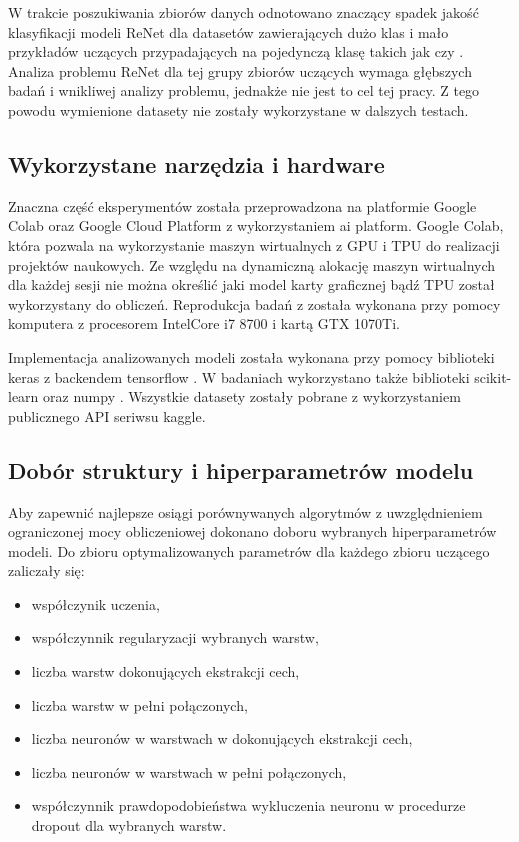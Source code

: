 \documentclass[oneside, mag]{mgr}
\begin{document}
W trakcie poszukiwania zbiorów danych odnotowano znaczący spadek jakość klasyfikacji modeli ReNet dla datasetów zawierających dużo klas i mało przykładów uczących przypadających na pojedynczą klasę takich jak \cite{fruits-dataset} czy \cite{face-dataset}. Analiza problemu ReNet dla tej grupy zbiorów uczących wymaga głębszych badań i wnikliwej analizy problemu, jednakże nie jest to cel tej pracy. Z tego powodu wymienione datasety nie zostały wykorzystane w dalszych testach. 

\subsection{Wykorzystane narzędzia i hardware}

Znaczna część eksperymentów została przeprowadzona na platformie Google Colab oraz Google Cloud Platform z wykorzystaniem ai platform. Google Colab, która pozwala na wykorzystanie maszyn wirtualnych z GPU i TPU do realizacji projektów naukowych. Ze względu na dynamiczną alokację maszyn wirtualnych dla każdej sesji nie można określić jaki model karty graficznej bądź TPU został wykorzystany do obliczeń. Reprodukcja badań z \cite{DBLP:journals/corr/VisinKCMCB15} została wykonana przy pomocy komputera z procesorem IntelCore i7 8700 i kartą GTX 1070Ti.

Implementacja analizowanych modeli została wykonana przy pomocy biblioteki keras \cite{keras} z backendem tensorflow \cite{tensorflow}. W badaniach wykorzystano także biblioteki scikit-learn \cite{scikit-learn} oraz numpy \cite{numpy}. Wszystkie datasety zostały pobrane z wykorzystaniem publicznego API seriwsu kaggle.

\subsection{Dobór struktury i hiperparametrów modelu}

Aby zapewnić najlepsze osiągi porównywanych algorytmów z uwzględnieniem ograniczonej mocy obliczeniowej dokonano doboru wybranych hiperparametrów modeli. Do zbioru optymalizowanych parametrów dla każdego zbioru uczącego zaliczały się:

\begin{itemize}
\item współczynik uczenia,
\item współczynnik regularyzacji wybranych warstw,
\item liczba warstw dokonujących ekstrakcji cech,
\item liczba warstw w pełni połączonych,
\item liczba neuronów w warstwach w dokonujących ekstrakcji cech,
\item liczba neuronów w warstwach w pełni połączonych,
\item współczynnik prawdopodobieństwa wykluczenia neuronu w procedurze dropout dla wybranych warstw.
\end{itemize}
\end{document}
